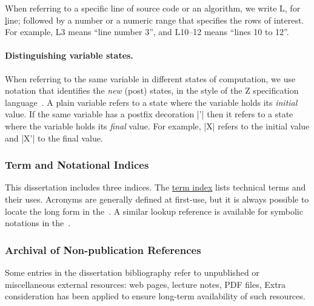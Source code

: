 When referring to a specific line of source code or an algorithm, we write L, for \underline{l}ine;
followed by a number or a numeric range that specifies the rows of interest.
For example, L3 means \enquote{line number 3}, and L10--12 means \enquote{lines 10 to 12}.

\paragraph*{Distinguishing variable states.}
When referring to the same variable in different states of computation, we use notation that identifies the \emph{new} (post) states,
in the style of the Z specification language~\cite{spivey1992}.
A plain variable refers to a state where the variable holds its \emph{initial} value.
If the same variable has a postfix decoration \pr|'| then it refers to a state where the variable holds its \emph{final} value.
For example, \pr|X| refers to the initial value and \pr|X'| to the final value.


\subsubsection{Term and Notational Indices}

This dissertation includes three indices.
The \hyperref[sec:app:index]{term index} lists technical terms and their uses.
Acronyms are generally defined at first-use, but it is always possible to locate the long form in the~\nameref{\acronymtype}.
A similar lookup reference is available for symbolic notations in the~.

\subsubsection{Archival of Non-publication References}

Some entries in the dissertation bibliography refer to unpublished or miscellaneous external resources: web pages, lecture notes, PDF files, \etc
Extra consideration has been applied to ensure long-term availability of such resources.

